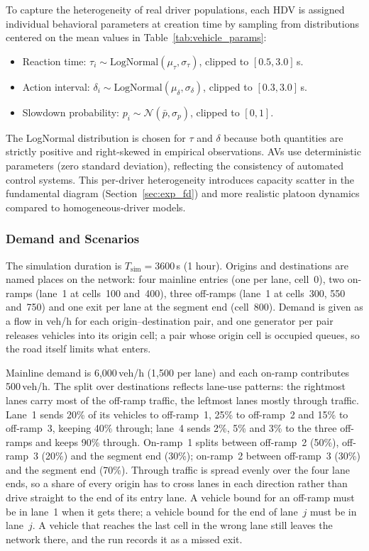 \documentclass[review,authoryear]{elsarticle}
\begin{document}
To capture the heterogeneity of real driver populations, each HDV is assigned individual behavioral parameters at creation time by sampling from distributions centered on the mean values in Table~\ref{tab:vehicle_params}:
\begin{itemize}
    \item Reaction time: $\tau_i \sim \text{LogNormal}(\mu_\tau, \sigma_\tau)$, clipped to $[0.5, 3.0]$\,s.
    \item Action interval: $\delta_i \sim \text{LogNormal}(\mu_\delta, \sigma_\delta)$, clipped to $[0.3, 3.0]$\,s.
    \item Slowdown probability: $p_i \sim \mathcal{N}(\bar{p}, \sigma_p)$, clipped to $[0, 1]$.
\end{itemize}
The LogNormal distribution is chosen for $\tau$ and $\delta$ because both quantities are strictly positive and right-skewed in empirical observations. AVs use deterministic parameters (zero standard deviation), reflecting the consistency of automated control systems. This per-driver heterogeneity introduces capacity scatter in the fundamental diagram (Section~\ref{sec:exp_fd}) and more realistic platoon dynamics compared to homogeneous-driver models.

\subsubsection{Demand and Scenarios}
\label{sec:demand}

The simulation duration is $T_{\text{sim}} = 3600$\,s (1 hour). Origins and destinations are named places on the network: four mainline entries (one per lane, cell~0), two on-ramps (lane~1 at cells~100 and~400), three off-ramps (lane~1 at cells~300, 550 and~750) and one exit per lane at the segment end (cell~800). Demand is given as a flow in veh/h for each origin--destination pair, and one generator per pair releases vehicles into its origin cell; a pair whose origin cell is occupied queues, so the road itself limits what enters.

Mainline demand is 6{,}000\,veh/h (1{,}500 per lane) and each on-ramp contributes 500\,veh/h. The split over destinations reflects lane-use patterns: the rightmost lanes carry most of the off-ramp traffic, the leftmost lanes mostly through traffic. Lane~1 sends 20\% of its vehicles to off-ramp~1, 25\% to off-ramp~2 and 15\% to off-ramp~3, keeping 40\% through; lane~4 sends 2\%, 5\% and 3\% to the three off-ramps and keeps 90\% through. On-ramp~1 splits between off-ramp~2 (50\%), off-ramp~3 (20\%) and the segment end (30\%); on-ramp~2 between off-ramp~3 (30\%) and the segment end (70\%). Through traffic is spread evenly over the four lane ends, so a share of every origin has to cross lanes in each direction rather than drive straight to the end of its entry lane. A vehicle bound for an off-ramp must be in lane~1 when it gets there; a vehicle bound for the end of lane~$j$ must be in lane~$j$. A vehicle that reaches the last cell in the wrong lane still leaves the network there, and the run records it as a missed exit.
\end{document}
